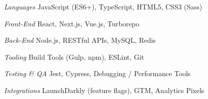 \begin{minipage}[t]{0.53\textwidth}
\begin{cvskills}

  \cvskill
    {\textit{Languages}} %
    {JavaScript (ES6+), TypeScript, HTML5, CSS3 (Sass)} %


 \cvskill
    {\textit{Front-End}} %
    {React, Next.js, Vue.js, Turborepo} %


  \cvskill
    {\textit{Back-End}} %
    {Node.js, RESTful APIs, MySQL, Redis} %

 
\end{cvskills}
\end{minipage}%
\begin{minipage}[t]{0.47\textwidth}
\begin{cvskills}

  \cvskill
    {\textit{Tooling}} %
    {Build Tools (Gulp, npm), ESLint, Git} %


  \cvskill
    {\textit{Testing \& QA}} %
    {Jest, Cypress, Debugging / Performance Tools} %


  \cvskill
    {\textit{Integrations}} %
    {LaunchDarkly (feature flags), GTM, Analytics Pixels} %

\end{cvskills}
\end{minipage}

%
